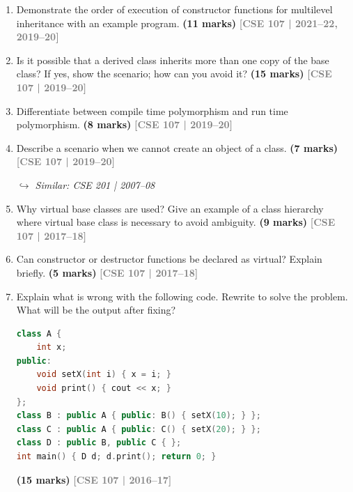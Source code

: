\documentclass[12pt,a3paper]{article}
\newcommand{\yr}[1]{\hfill\textcolor{gray}{\small\textbf{[#1]}}}
\newcommand{\mk}[1]{\textcolor{orange!70!black}{\small\textbf{(#1 marks)}}}
\newcommand{\variant}[1]{\par\vspace{1pt}\textcolor{blue!50!black}%
  {\footnotesize\textit{$\hookrightarrow$ Similar: #1}}}
\begin{document}
\begin{enumerate}
\item Demonstrate the order of execution of constructor functions for multilevel inheritance with an example program. \mk{11}
\yr{CSE 107 | 2021--22, 2019--20}




\item Is it possible that a derived class inherits more than one copy of the base class? If yes, show the scenario; how can you avoid it? \mk{15}
\yr{CSE 107 | 2019--20}




\item Differentiate between compile time polymorphism and run time polymorphism. \mk{8}
\yr{CSE 107 | 2019--20}




\item Describe a scenario when we cannot create an object of a class. \mk{7}
\yr{CSE 107 | 2019--20}
\variant{CSE 201 | 2007--08}




\item Why virtual base classes are used? Give an example of a class hierarchy where virtual base class is necessary to avoid ambiguity. \mk{9}
\yr{CSE 107 | 2017--18}





\item Can constructor or destructor functions be declared as virtual? Explain briefly. \mk{5}
\yr{CSE 107 | 2017--18}

\item Explain what is wrong with the following code. Rewrite to solve the problem. What will be the output after fixing?
\begin{lstlisting}[language=C++]
class A {
    int x;
public:
    void setX(int i) { x = i; }
    void print() { cout << x; }
};
class B : public A { public: B() { setX(10); } };
class C : public A { public: C() { setX(20); } };
class D : public B, public C { };
int main() { D d; d.print(); return 0; }
\end{lstlisting}
\mk{15}
\yr{CSE 107 | 2016--17}


\end{enumerate}
\end{document}
